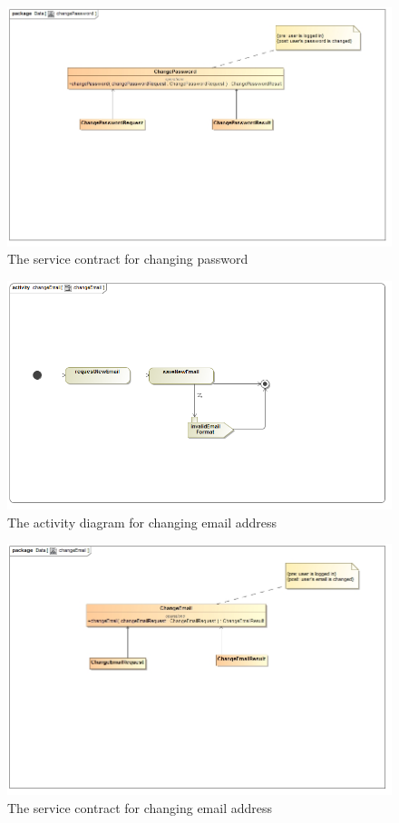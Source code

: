 \documentclass[a4paper,12pt]{article}
\begin{document}
\begin{figure}[H]
	\centering
	\includegraphics[width=1.0\textwidth]{images/changePasswordSC.jpg}
	\caption{The service contract for changing password}
\end{figure}

\begin{figure}[H]
  \centering
    \includegraphics[width=1.0\textwidth]{images/changeEmail.png} 
    \caption{The activity diagram for changing email address}
\end{figure}
	
\begin{figure}[H]
	\centering
	\includegraphics[width=1.0\textwidth]{images/changeEmailSC.jpg}
	\caption{The service contract for changing email address}
\end{figure}
\end{document}
